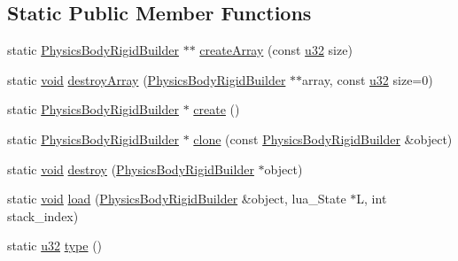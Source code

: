 \subsection*{Static Public Member Functions}
\begin{DoxyCompactItemize}
\item 
static \mbox{\hyperlink{classnjli_1_1_physics_body_rigid_builder}{Physics\+Body\+Rigid\+Builder}} $\ast$$\ast$ \mbox{\hyperlink{classnjli_1_1_physics_body_rigid_builder_ab596f9f3c7c403805ed7522c0e2a8d3e}{create\+Array}} (const \mbox{\hyperlink{_util_8h_a10e94b422ef0c20dcdec20d31a1f5049}{u32}} size)
\item 
static \mbox{\hyperlink{_thread_8h_af1e856da2e658414cb2456cb6f7ebc66}{void}} \mbox{\hyperlink{classnjli_1_1_physics_body_rigid_builder_a6ffac3801a48f17edaeec435e0fb4c20}{destroy\+Array}} (\mbox{\hyperlink{classnjli_1_1_physics_body_rigid_builder}{Physics\+Body\+Rigid\+Builder}} $\ast$$\ast$array, const \mbox{\hyperlink{_util_8h_a10e94b422ef0c20dcdec20d31a1f5049}{u32}} size=0)
\item 
static \mbox{\hyperlink{classnjli_1_1_physics_body_rigid_builder}{Physics\+Body\+Rigid\+Builder}} $\ast$ \mbox{\hyperlink{classnjli_1_1_physics_body_rigid_builder_a0e839f557f35c6fcb76de21ad7161f1d}{create}} ()
\item 
static \mbox{\hyperlink{classnjli_1_1_physics_body_rigid_builder}{Physics\+Body\+Rigid\+Builder}} $\ast$ \mbox{\hyperlink{classnjli_1_1_physics_body_rigid_builder_a20e077423efb4ff6ea1c8325129809b0}{clone}} (const \mbox{\hyperlink{classnjli_1_1_physics_body_rigid_builder}{Physics\+Body\+Rigid\+Builder}} \&object)
\item 
static \mbox{\hyperlink{_thread_8h_af1e856da2e658414cb2456cb6f7ebc66}{void}} \mbox{\hyperlink{classnjli_1_1_physics_body_rigid_builder_add6f126172e4b520d49594c4e42a0931}{destroy}} (\mbox{\hyperlink{classnjli_1_1_physics_body_rigid_builder}{Physics\+Body\+Rigid\+Builder}} $\ast$object)
\item 
static \mbox{\hyperlink{_thread_8h_af1e856da2e658414cb2456cb6f7ebc66}{void}} \mbox{\hyperlink{classnjli_1_1_physics_body_rigid_builder_a670c0e458615527675736bfde8fdd1e1}{load}} (\mbox{\hyperlink{classnjli_1_1_physics_body_rigid_builder}{Physics\+Body\+Rigid\+Builder}} \&object, lua\+\_\+\+State $\ast$L, int stack\+\_\+index)
\item 
static \mbox{\hyperlink{_util_8h_a10e94b422ef0c20dcdec20d31a1f5049}{u32}} \mbox{\hyperlink{classnjli_1_1_physics_body_rigid_builder_a7f6dc2947c99ff79f5d8ccb376ecca34}{type}} ()
\end{DoxyCompactItemize}
